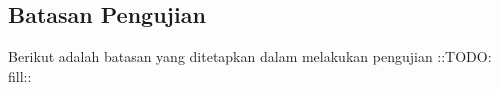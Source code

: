 \subsection{Batasan Pengujian}
\label{subsec:batasan-pengujian}
Berikut adalah batasan yang ditetapkan dalam melakukan pengujian ::TODO: fill::